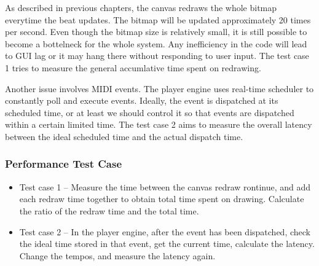 As described in previous chapters, the canvas redraws the whole bitmap everytime 
the beat updates. The bitmap will be updated approximately 20 times per second.
Even though the bitmap size is relatively small, it is still possible to become 
a bottelneck for the whole system. Any inefficiency in the code will lead to GUI 
lag or it may hang there without responding to user input. The test case 1 tries 
to measure the general accumlative time spent on redrawing. 

Another issue involves MIDI events. The player engine uses real-time scheduler to  
constantly poll and execute events. Ideally, the event is dispatched at its 
scheduled time, or at least we should control it so that events are dispatched within 
a certain limited time. The test case 2 aims to measure the overall latency between 
the ideal scheduled time and the actual dispatch time. 
\subsubsection{Performance Test Case}
\begin{itemize}
  \item Test case 1 -- Measure the time between the canvas redraw rontinue, and 
        add each redraw time together to obtain total time spent on drawing. 
        Calculate the ratio of the redraw time and the total time.
  \item Test case 2 -- In the player engine, after the event has been dispatched, 
        check the ideal time stored in that event, get the current time, calculate 
        the latency. Change the tempos, and measure the latency again.
\end{itemize}
